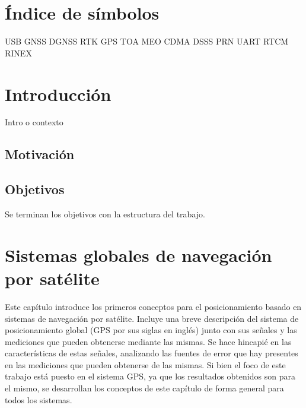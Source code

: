 \documentclass[a4paper,12pt,oneside,onecolumn,final,openright]{book}%
\begin{document}
\chapter*{Índice de símbolos}
USB
GNSS
DGNSS
RTK
GPS
TOA
MEO
CDMA
DSSS
PRN
UART
RTCM
RINEX

\newpage
{}
\tableofcontents
\newpage
{}
\listoffigures


\chapter*{Introducción}
Intro o contexto
\section*{Motivación}
\section*{Objetivos}
Se terminan los objetivos con la estructura del trabajo.
\chapter{Sistemas globales de navegación por satélite}\label{ch:GNSS}
	Este capítulo introduce los primeros conceptos para el posicionamiento basado en sistemas de navegación por satélite. Incluye una breve descripción del sistema de posicionamiento global (GPS por sus siglas en inglés) junto con sus señales y las mediciones que pueden obtenerse mediante las mismas. Se hace hincapié en las características de estas señales, analizando las fuentes de error que hay presentes en las mediciones que pueden obtenerse de las mismas. Si bien el foco de este trabajo está puesto en el sistema GPS, ya que los resultados obtenidos son para el mismo, se desarrollan los conceptos de este capítulo de forma general para todos los sistemas. 
	
\end{document}
